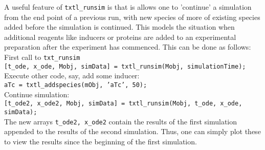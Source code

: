 			\begin{comment}
			\vspace{1\baselineskip}
			When a Simbiology model is created, there is a default configuration set object associated with it, and we can use the \texttt{getconfigset} command to get a pointer to this object. This is illustrated below by using 'active' argument, since when the model object is created, the default configuration set is the active one. We can then set its properties like the end time we want our model to be simulated until: \\
\texttt{configsetObj = getconfigset(Mobj, 'active');} \\
\texttt{set(configsetObj, 'StopTime', 8*60*60)} \\

After which we can execute \texttt{txtl\_runsim}: \\
\texttt{[t\_ode, x\_ode, Mobj, simData] = txtl\_runsim(Mobj, configsetObj);} 
\end{comment}
\vspace{1\baselineskip}
A useful feature of \texttt{txtl\_runsim} is that is allows one to 'continue' a simulation from the end point of a previous run, with new species of more of existing species added before the simulation is continued. This models the situation when additional reagents like inducers or proteins are added to an experimental preparation after the experiment has commenced. This can be done as follows: \\

First call to \texttt{txt\_runsim} \\
\texttt{[t\_ode, x\_ode, Mobj, simData] = txtl\_runsim(Mobj, simulationTime);} \\

Execute other code, say, add some inducer: \\
\texttt{aTc = txtl\_addspecies(mObj, 'aTc', 50);}\\

Continue simulation:\\
\texttt{[t\_ode2, x\_ode2, Mobj, simData] = txtl\_runsim(Mobj, t\_ode, x\_ode, simData);} \\

The new arrays \texttt{t\_ode2, x\_ode2} contain the results of the first simulation appended to the results of the second simulation. Thus, one can simply plot these to view the results since the beginning of the first simulation. 


